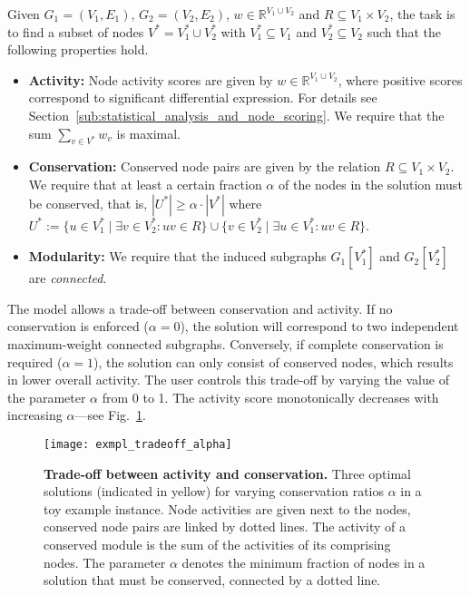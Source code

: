 		\begin{problem}
  	  	  Given $G_1=(V_1,E_1)$, $G_2 = (V_2,E_2)$, $w \in \mathbb{R}^{V_1 \cup V_2}$ and $R \subseteq V_1 \times V_2$, the task is to find a subset of nodes $V^* = V^*_1 \cup V^*_2$ with 
		$V^*_1 \subseteq V_1$ and $V^*_2 \subseteq V_2$ such that the following 
		properties hold.
		\begin{itemize}
		\item \textbf{Activity:}
  	  	  Node activity scores are given by $w \in
    	 	 \mathbb{R}^{V_1 \cup V_2}$, where positive scores correspond to
    	 	 significant differential expression. For details see Section~\ref{sub:statistical_analysis_and_node_scoring}.
		We require that the sum $\sum_{v \in V^*} w_v$ is maximal.
		\item \textbf{Conservation:}
  	  	  Conserved node pairs are given by the relation $R
    	 	 \subseteq V_1 \times V_2$. We require that at least a certain fraction $\alpha$ of the nodes in the solution must be
  	  	  conserved, that is, $|U^*| \geq \alpha \cdot |V^*|$ where $U^* := \{u \in V_1^*
  	  	  \mid \exists v \in V_2^*: uv \in R\} \cup \{v \in V_2^*
  	  	  \mid \exists u \in V_1^*: uv \in R\}$.
		\item  \textbf{Modularity:}
  	  	  We require that the induced subgraphs $G_1[V^*_1]$ and $G_2[V^*_2]$ are \emph{connected}.
		\end{itemize}
		\end{problem}

		The model allows a trade-off between conservation and activity. If no conservation is
		enforced ($\alpha = 0$), the solution will correspond to two independent
		maximum-weight connected subgraphs. %
		Conversely, if complete conservation is required ($\alpha = 1$), the solution
		can only consist of conserved nodes, which results in lower overall
		activity. The user controls this trade-off by varying the value of the parameter
		$\alpha$ from 0 to 1. The activity score 
		monotonically decreases with increasing
		$\alpha$---see Fig.~\ref{fig:exmpl_tradeoff_alpha}. 

		\begin{figure}[t]
			\centering
			\texttt{[image: exmpl\_tradeoff\_alpha]}
			\caption{\textbf{Trade-off between activity and conservation.}
				Three optimal solutions (indicated in yellow) for varying conservation ratios
				$\alpha$ in a toy example instance. Node activities 
				are given next to the
				nodes, conserved node pairs are linked by dotted lines. The activity of a
				conserved module is the sum of the activities of its comprising nodes. The
				parameter $\alpha$ denotes the minimum fraction of nodes in a solution that
				must be conserved, \ie{} connected by a dotted line.}
			\label{fig:exmpl_tradeoff_alpha}
		\end{figure}

